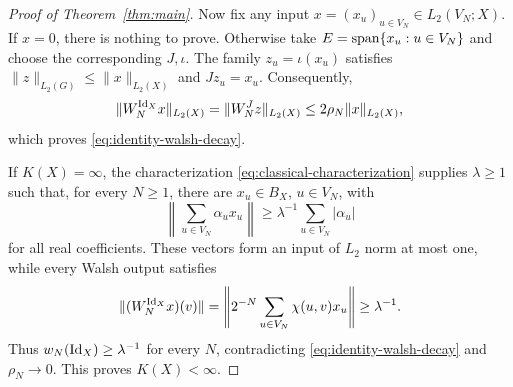 \begin{proof}[Proof of Theorem~\ref{thm:main}]
Now fix any input \(x=(x_u)_{u\in V_N}\in L_2(V_N;X)\).
If \(x=0\), there is nothing to prove. Otherwise take
\(E=\operatorname{span}\{x_u:u\in V_N\}\) and choose the corresponding \(J,\iota\).
The family \(z_u=\iota(x_u)\) satisfies
\(\|z\|_{L_2(G)}\le\|x\|_{L_2(X)}\) and \(Jz_u=x_u\).
Consequently,
\[
\|W_N^{\mathrm{Id}_X}x\|_{L_2(X)}
=\|W_N^Jz\|_{L_2(X)}
\le2\rho_N\|x\|_{L_2(X)},
\]
which proves \eqref{eq:identity-walsh-decay}.

If \(K(X)=\infty\), the characterization
\eqref{eq:classical-characterization} supplies \(\lambda\ge1\)
such that, for every \(N\ge1\), there are \(x_u\in B_X\), \(u\in V_N\),
with
\[
\left\|\sum_{u\in V_N}\alpha_u x_u\right\|
\ge\lambda^{-1}\sum_{u\in V_N}|\alpha_u|
\]
for all real coefficients. These vectors form an input of \(L_2\)
norm at most one, while every Walsh output satisfies
\[
\|(W_N^{\mathrm{Id}_X}x)(v)\|
=\left\|2^{-N}\sum_{u\in V_N}\chi(u,v)x_u\right\|
\ge\lambda^{-1}.
\]
Thus \(w_N(\mathrm{Id}_X)\ge\lambda^{-1}\) for every \(N\), contradicting
\eqref{eq:identity-walsh-decay} and \(\rho_N\to0\).
This proves \(K(X)<\infty\).
\end{proof}

